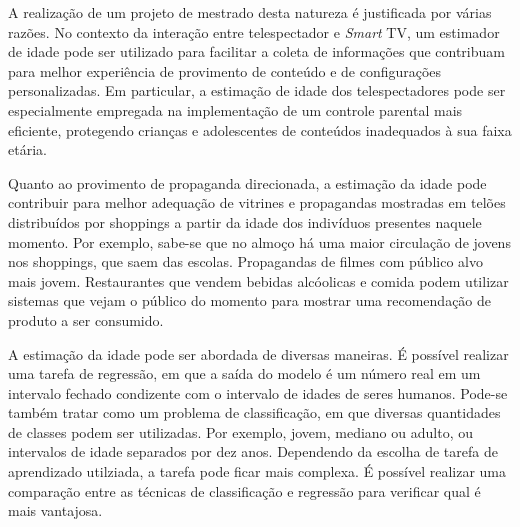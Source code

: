 
A realização de um projeto de mestrado desta natureza é justificada por várias razões. No contexto da interação entre telespectador e \emph{Smart} TV, um estimador de idade pode ser utilizado para facilitar a coleta de informações que contribuam para melhor experiência de provimento de conteúdo e de configurações personalizadas. Em particular, a estimação de idade dos telespectadores pode ser especialmente empregada na implementação de um controle parental mais eficiente, protegendo crianças e adolescentes de conteúdos inadequados à sua faixa etária.

Quanto ao provimento de propaganda direcionada, a estimação da idade pode contribuir para melhor adequação de vitrines e propagandas mostradas em telões distribuídos por shoppings a partir da idade dos indivíduos presentes naquele momento. Por exemplo, sabe-se que no almoço há uma maior circulação de jovens nos shoppings, que saem das escolas. Propagandas de filmes com público alvo mais jovem. Restaurantes que vendem bebidas alcóolicas e comida podem utilizar sistemas que vejam o público do momento para mostrar uma recomendação de produto a ser consumido.

A estimação da idade pode ser abordada de diversas maneiras. É possível realizar uma tarefa de regressão, em que a saída do modelo é um número real em um intervalo fechado condizente com o intervalo de idades de seres humanos. Pode-se também tratar como um problema de classificação, em que diversas quantidades de classes podem ser utilizadas. Por exemplo, jovem,  mediano ou adulto, ou intervalos de idade separados por dez anos. Dependendo da escolha de tarefa de aprendizado utilziada, a tarefa pode ficar mais complexa. É possível realizar uma comparação entre as técnicas de classificação e regressão para verificar qual é mais vantajosa.

